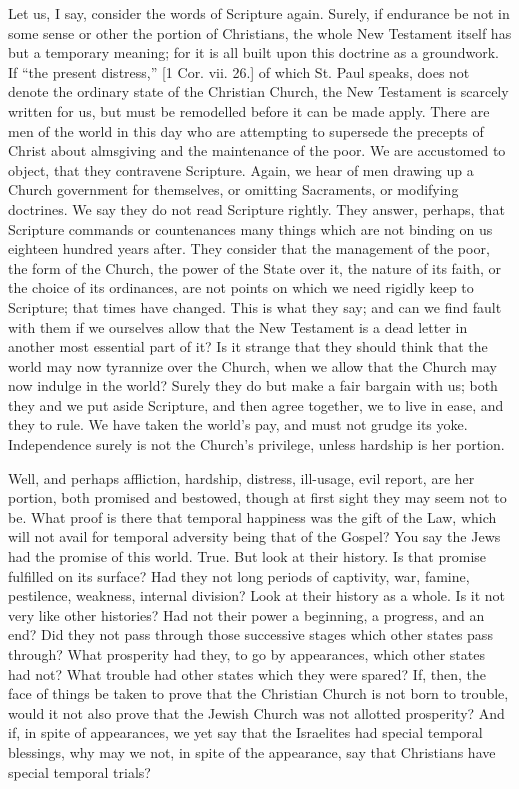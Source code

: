 Let us, I say, consider the words of Scripture again. Surely, if
endurance be not in some sense or other the portion of Christians, the
whole New Testament itself has but a temporary meaning; for it is all
built upon this doctrine as a groundwork. If ``the present
distress,'' [1 Cor. vii. 26.] of which St. Paul speaks, does not
denote the ordinary state of the Christian Church, the New Testament
is scarcely written for us, but must be remodelled before it can be
made apply. There are men of the world in this day who are attempting
to supersede the precepts of Christ about almsgiving and the
maintenance of the poor. We are accustomed to object, that they
contravene Scripture. Again, we hear of men drawing up a Church
government for themselves, or omitting Sacraments, or modifying
doctrines. We say they do not read Scripture rightly. They answer,
perhaps, that Scripture commands or countenances many things which are
not binding on us eighteen hundred years after. They consider that the
management of the poor, the form of the Church, the power of the State
over it, the nature of its faith, or the choice of its ordinances, are
not points on which we need rigidly keep to Scripture; that times have
changed. This is what they say; and can we find fault with them if we
ourselves allow that the New Testament is a dead letter in another
most essential part of it? Is it strange that they should think that
the world may now tyrannize over the Church, when we allow that the
Church may now indulge in the world? Surely they do but make a fair
bargain with us; both they and we put aside Scripture, and then agree
together, we to live in ease, and they to rule. We have taken the
world's pay, and must not grudge its yoke. Independence surely is not
the Church's privilege, unless hardship is her portion.

Well, and perhaps affliction, hardship, distress, ill-usage, evil
report, are her portion, both promised and bestowed, though at first
sight they may seem not to be. What proof is there that temporal
happiness was the gift of the Law, which will not avail for temporal
adversity being that of the Gospel? You say the Jews had the promise
of this world. True. But look at their history. Is that promise
fulfilled on its surface? Had they not long periods of captivity, war,
famine, pestilence, weakness, internal division? Look at their history
as a whole. Is it not very like other histories? Had not their power a
beginning, a progress, and an end? Did they not pass through those
successive stages which other states pass through? What prosperity had
they, to go by appearances, which other states had not? What trouble
had other states which they were spared? If, then, the face of things
be taken to prove that the Christian Church is not born to trouble,
would it not also prove that the Jewish Church was not allotted
prosperity? And if, in spite of appearances, we yet say that the
Israelites had special temporal blessings, why may we not, in spite of
the appearance, say that Christians have special temporal trials?

